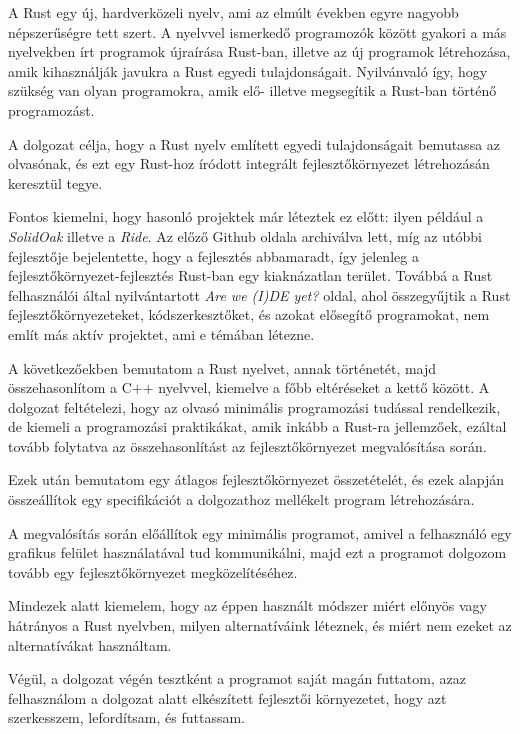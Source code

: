 

A Rust egy új, hardverközeli nyelv, ami az elmúlt években egyre nagyobb
népszerűségre tett szert.
A nyelvvel ismerkedő programozók között gyakori a más nyelvekben írt
programok újraírása Rust-ban, illetve az új programok létrehozása,
amik kihasználják javukra a Rust egyedi tulajdonságait.
Nyilvánvaló így, hogy szükség van olyan programokra, amik elő- illetve megsegítik
a Rust-ban történő programozást.

A dolgozat célja, hogy a Rust nyelv említett egyedi tulajdonságait
bemutassa az olvasónak, és ezt egy Rust-hoz íródott integrált fejlesztőkörnyezet
létrehozásán keresztül tegye.

Fontos kiemelni, hogy hasonló projektek már léteztek ez előtt:
ilyen például a \textit{SolidOak}\cite{solidoak} illetve a \textit{Ride}\cite{ride}.
Az előző Github oldala archiválva lett, míg az utóbbi fejlesztője
bejelentette, hogy a fejlesztés abbamaradt, így jelenleg a fejlesztőkörnyezet-fejlesztés
Rust-ban egy kiaknázatlan terület.
Továbbá a Rust felhasználói által nyilvántartott \textit{Are we (I)DE yet?}\cite{ideyet} oldal,
ahol összegyűjtik a Rust fejlesztőkörnyezeteket, kódszerkesztőket, és azokat elősegítő programokat,
nem említ más aktív projektet, ami e témában létezne.

A következőekben bemutatom a Rust nyelvet, annak történetét, majd
összehasonlítom a C++ nyelvvel, kiemelve a főbb eltéréseket a kettő között.
A dolgozat feltételezi, hogy az olvasó minimális programozási tudással
rendelkezik, de kiemeli a programozási praktikákat, amik inkább a Rust-ra
jellemzőek, ezáltal tovább folytatva az összehasonlítást az fejlesztőkörnyezet
megvalósítása során.

Ezek után bemutatom egy átlagos fejlesztőkörnyezet összetételét, és
ezek alapján összeállítok egy specifikációt a dolgozathoz mellékelt
program létrehozására.

A megvalósítás során előállítok egy minimális programot, amivel a felhasználó
egy grafikus felület használatával tud kommunikálni,
majd ezt a programot dolgozom tovább egy fejlesztőkörnyezet megközelítéséhez.

Mindezek alatt kiemelem, hogy az éppen használt módszer miért előnyös
vagy hátrányos a Rust nyelvben, milyen alternatíváink léteznek, és
miért nem ezeket az alternatívákat használtam.

Végül, a dolgozat végén tesztként a programot saját magán futtatom, azaz felhasználom
a dolgozat alatt elkészített fejlesztői környezetet, hogy azt
szerkesszem, lefordítsam, és futtassam.



